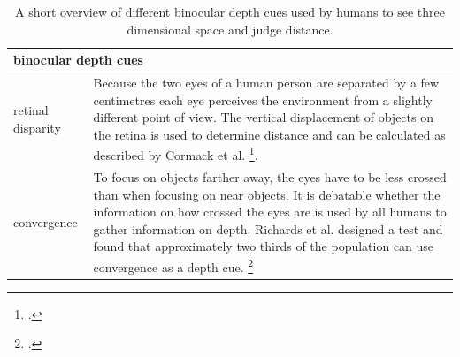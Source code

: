 \begin{table}[h!]
	\begin{tabularx}{\textwidth}{|l|X|}
		\hline
		\multicolumn{2}{|l|}{\textbf{binocular depth cues}} \\
		\hline
		retinal disparity & Because the two eyes of a human person are separated by a few centimetres each eye perceives the environment from a slightly different point of view. The vertical displacement of objects on the retina is used to determine distance and can be calculated as described by Cormack et al. \footcite{Cormack_The_computation_of_retinal_disparity}.\\
		\hline
		convergence & To focus on objects farther away, the eyes have to be less crossed than when focusing on near objects. It is debatable whether the information on how crossed the eyes are is used by all humans to gather information on depth. Richards et al. designed a test and found that approximately two thirds of the population can use convergence as a depth cue. \footcite{Richards_Convergence_as_a_cue_to_depth} \\
		\hline
	\end{tabularx}
	\label{tab:study_of_literature_binocular_depth_cues}
	\caption{A short overview of different binocular depth cues used by humans to see three dimensional space and judge distance.}
\end{table}

\newpage

